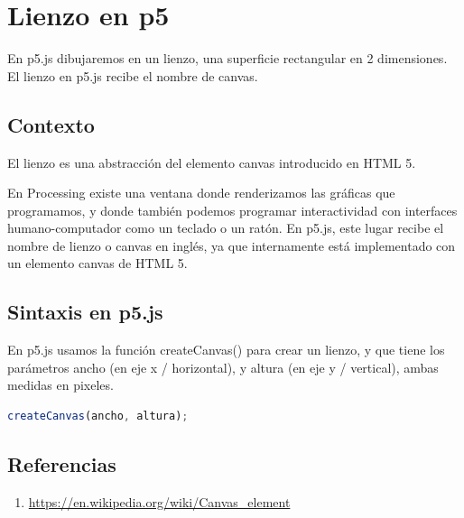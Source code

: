 \documentclass[../principal.tex]{subfiles}
\begin{document}
\chapter{Lienzo en p5}

En p5.js dibujaremos en un lienzo, una superficie rectangular en 2 dimensiones. El lienzo en p5.js recibe el nombre de canvas.

\section{Contexto}

El lienzo es una abstracción del elemento canvas introducido en HTML 5.

En Processing existe una ventana donde renderizamos las gráficas que programamos, y donde también podemos programar interactividad con interfaces humano-computador como un teclado o un ratón. En p5.js, este lugar recibe el nombre de lienzo o canvas en inglés, ya que internamente está implementado con un elemento canvas de HTML 5.

\section{Sintaxis en p5.js}

En p5.js usamos la función createCanvas() para crear un lienzo, y que tiene los parámetros ancho (en eje x / horizontal), y altura (en eje y / vertical), ambas medidas en pixeles.

\begin{lstlisting}[language=JavaScript]
    createCanvas(ancho, altura);
\end{lstlisting}

\section{Referencias}

\begin{enumerate}
    \item  \url{https://en.wikipedia.org/wiki/Canvas_element}
\end{enumerate}
\end{document}
